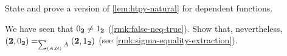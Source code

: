 \begin{ex}\label{ex:dep-htpy-natural}
  State and prove a version of \cref{lem:htpy-natural} for dependent functions.
\end{ex}

\begin{ex}\label{ex:sigma-eq-components-neq}
  We have seen that ${0_{\mathbf{2}}} \neq {1_{\ensuremath{\mathbf{2}}}}$ (\cref{rmk:false-neq-true}). Show that, nevertheless, $(\bool, \bfalse) =_{\sm{A:\type}A} (\bool, \btrue)$ (see \cref{rmk:sigma-equality-extraction}).
\end{ex}

